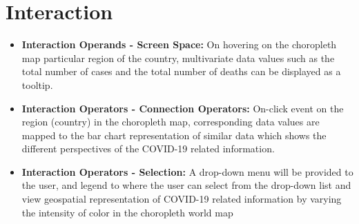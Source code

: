 \documentclass[10pt]{article}
\begin{document}
\section{Interaction}
\begin{itemize}
    \item \textbf{Interaction Operands - Screen Space:} On hovering on the choropleth map particular region of the country,
    multivariate data values such as the total number of cases and the total number of deaths can be displayed as a tooltip.
    \item \textbf{Interaction Operators - Connection Operators:} On-click event on the region (country) in the choropleth map,
    corresponding data values are mapped to the bar chart representation of similar data which shows the different perspectives of the COVID-19 related information.
    \item \textbf{Interaction Operators - Selection:} A drop-down menu will be provided to the user, and legend to 
    where the user can select from the drop-down list and view geospatial representation of COVID-19 related information by varying the intensity of color in the choropleth world map
\end{itemize}
\end{document}
